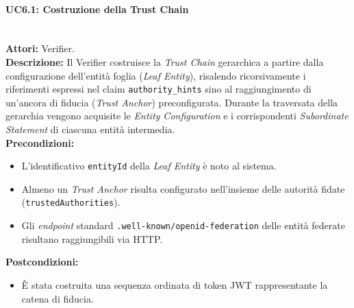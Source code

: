 \paragraph{\large\bfseries UC6.1: Costruzione della Trust Chain}
\label{uc:verifier:uc6.1}
\mbox{}\\
\noindent\textbf{Attori:} Verifier.
\\
\noindent\textbf{Descrizione:} Il Verifier costruisce la \textit{Trust Chain} gerarchica a partire dalla configurazione dell'entità foglia (\textit{Leaf Entity}), risalendo ricorsivamente i riferimenti espressi nel claim \texttt{authority\_\allowbreak{}hints} sino al raggiungimento di un'ancora di fiducia (\textit{Trust Anchor}) preconfigurata. Durante la traversata della gerarchia vengono acquisite le \textit{Entity Configuration} e i corrispondenti \textit{Subordinate Statement} di ciascuna entità intermedia.
\\
\noindent\textbf{Precondizioni:}
\begin{itemize}
    \item L'identificativo \texttt{entityId} della \textit{Leaf Entity} è noto al sistema.
    \item Almeno un \textit{Trust Anchor} risulta configurato nell'insieme delle autorità fidate (\texttt{trustedA\-\allowbreak{}uthorities}).
    \item Gli \textit{endpoint} standard \texttt{.well-\allowbreak{}known/openid-\allowbreak{}federation} delle entità federate risultano raggiungibili via HTTP.
\end{itemize}
\noindent\textbf{Postcondizioni:}
\begin{itemize}
    \item È stata costruita una sequenza ordinata di token JWT rappresentante la catena di fiducia.
\end{itemize}

